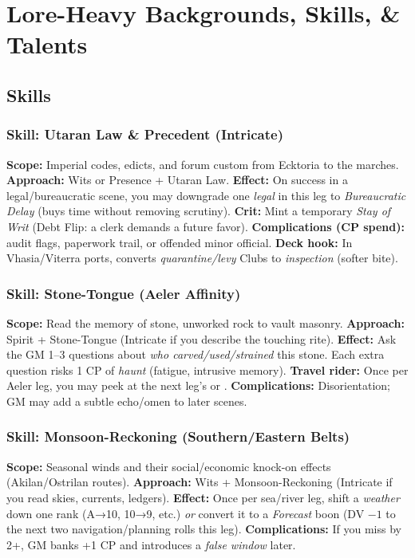 \chapter{Lore-Heavy Backgrounds, Skills, \& Talents}

\section{Skills}

\subsection{Skill: Utaran Law \& Precedent (Intricate)}
\textbf{Scope:} Imperial codes, edicts, and forum custom from Ecktoria to the marches.
\textbf{Approach:} Wits or Presence + Utaran Law.
\textbf{Effect:} On success in a legal/bureaucratic scene, you may downgrade one \emph{legal} \SuitClub{} in this leg to \emph{Bureaucratic Delay} (buys time without removing scrutiny).
\textbf{Crit:} Mint a temporary \SuitDiamond{} \emph{Stay of Writ} (Debt Flip: a clerk demands a future favor).
\textbf{Complications (CP spend):} audit flags, paperwork trail, or offended minor official.
\textbf{Deck hook:} In Vhasia/Viterra ports, converts \emph{quarantine/levy} Clubs to \emph{inspection} (softer bite).

\subsection{Skill: Stone-Tongue (Aeler Affinity)}
\textbf{Scope:} Read the memory of stone, unworked rock to vault masonry.
\textbf{Approach:} Spirit + Stone-Tongue (Intricate if you describe the touching rite).
\textbf{Effect:} Ask the GM 1--3 questions about \emph{who carved/used/strained} this stone. Each extra question risks 1 CP of \emph{haunt} (fatigue, intrusive memory).
\textbf{Travel rider:} Once per Aeler leg, you may peek at the next leg's \SuitSpade{} or \SuitClub{}.
\textbf{Complications:} Disorientation; GM may add a subtle echo/omen to later scenes.

\subsection{Skill: Monsoon-Reckoning (Southern/Eastern Belts)}
\textbf{Scope:} Seasonal winds and their social/economic knock-on effects (Akilan/Ostrilan routes).
\textbf{Approach:} Wits + Monsoon-Reckoning (Intricate if you read skies, currents, ledgers).
\textbf{Effect:} Once per sea/river leg, shift a \emph{weather} \SuitClub{} down one rank (A→10, 10→9, etc.) \emph{or} convert it to a \emph{Forecast} boon (DV $-1$ to the next two navigation/planning rolls this leg).
\textbf{Complications:} If you miss by 2+, GM banks +1 CP and introduces a \emph{false window} later.

